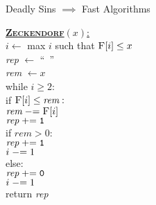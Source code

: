 \documentclass[aspectratio=169]{beamer}
\begin{document}
\begin{frame}{Deadly Sins $\implies$ Fast Algorithms}
   \begin{nalgo}[0.925]
       \underline{\textbf{\textsc{Zeckendorf}}$(x)$:}\+
    \\\label{}      $i \gets$ max $i$ such that $\textsc{F}[i] \leq x$
    \\\label{}      \textit{rep} $\gets $ ``~''
    \\\label{}      \textit{rem} $\gets x$
    \\\label{}      while $i \geq 2:$\+
    \\\label{}          if $\textsc{F}[i] \leq \textit{rem}:$\+
    \\\label{}              $\textit{rem} \mathrel{-}= \textsc{F}[i]$
    \\\label{}              $\textit{rep} \mathrel{+}= \texttt{1}$
    \\\label{}              if $\textit{rem} > 0:$\+
    \\\label{}                  $\textit{rep} \mathrel{+}= \texttt{1}$
    \\\label{}                  $i \mathrel{-}= 1$\-\-
    \\\label{}          else:\+
    \\\label{}              $\textit{rep} \mathrel{+}= \texttt{0}$\-
    \\\label{}          $i \mathrel{-}= 1$\-
    \\\label{}      return \textit{rep}
   \end{nalgo}
\end{frame}
\end{document}
